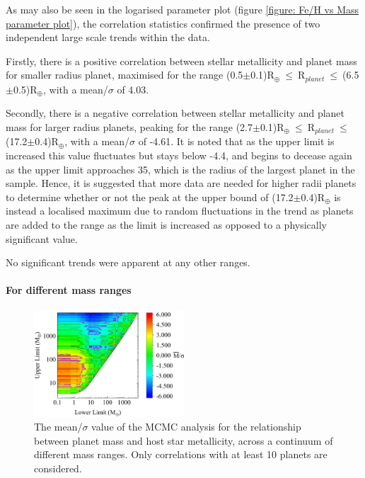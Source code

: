 \documentclass[a4paper,twocolumn,12pt]{article}
\begin{document}
As may also be seen in the logarised parameter plot (figure \ref{figure: Fe/H vs Mass parameter plot}), the correlation statistics confirmed the presence of two independent large scale trends within the data.

Firstly, there is a positive correlation between stellar metallicity and planet mass for smaller radius planet, maximised for the range (0.5$\pm$0.1)R$_{\oplus}~\leq~$R$_{planet}~\leq~$(6.5$\pm$0.5)R$_{\oplus}$, with a mean/$\sigma$ of 4.03.

Secondly, there is a negative correlation between stellar metallicity and planet mass for larger radius planets, peaking for the range (2.7$\pm$0.1)R$_{\oplus}~\leq~$R$_{planet}~\leq~$(17.2$\pm$0.4)R$_{\oplus}$, with a mean/$\sigma$ of -4.61. It is noted that as the upper limit is increased this value fluctuates but stays below -4.4, and begins to decease again as the upper limit approaches 35, which is the radius of the largest planet in the sample. Hence, it is suggested that more data are needed for higher radii planets to determine whether or not the peak at the upper bound of (17.2$\pm$0.4)R$_{\oplus}$ is instead a localised maximum due to random fluctuations in the trend as planets are added to the range as the limit is increased as opposed to a physically significant value.

No significant trends were apparent at any other ranges.




\paragraph{For different mass ranges}

\begin{figure}[h!]
    \centering
    \includegraphics[width=0.5\textwidth]{Graphs/FeH vs Mass correlations - Mass ranges.pdf}
    \caption{The mean/$\sigma$ value of the MCMC analysis for the relationship between planet mass and host star metallicity, across a continuum of different mass ranges. Only correlations with at least 10 planets are considered.}
    \label{figure: Fe/H vs Mass correlations - Mass ranges}
\end{figure}
\end{document}
